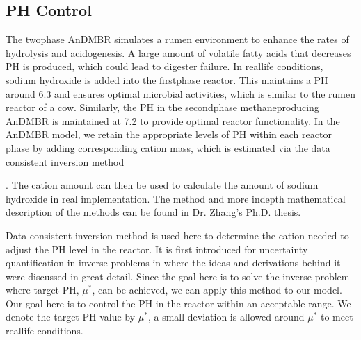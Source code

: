 \documentclass[a4paper,10pt,english]{sphinxmanual}
\begin{document}
{
\begin{sphinxVerbatim}[commandchars=\\\{\}]
\llap{\color{nbsphinxin}[ ]:\,\hspace{\fboxrule}\hspace{\fboxsep}}
\end{sphinxVerbatim}
}


\subsection{PH Control}
\label{\detokenize{jupyter_notebook/phcontrol:ph-control}}\label{\detokenize{jupyter_notebook/phcontrol::doc}}
\sphinxAtStartPar
The two\sphinxhyphen{}phase AnDMBR simulates a rumen environment to enhance the rates of hydrolysis and acidogenesis. A large amount of volatile fatty acids that decreases PH is produced, which could lead to digester failure. In real\sphinxhyphen{}life conditions, sodium hydroxide is added into the first\sphinxhyphen{}phase reactor. This maintains a PH around 6.3 and ensures optimal microbial activities, which is similar to the rumen reactor of a cow. Similarly, the PH in the second\sphinxhyphen{}phase methane\sphinxhyphen{}producing AnDMBR is maintained at 7.2 to provide optimal reactor functionality. In the AnDMBR model, we retain the appropriate levels of PH within each reactor phase by adding corresponding cation mass, which is estimated via the data consistent inversion method %
\begin{footnote}[1]\sphinxAtStartFootnote
{}
%
\end{footnote}. The cation amount can then be used to calculate the amount of sodium hydroxide in real implementation. The method and more in\sphinxhyphen{}depth mathematical description of the  methods can be found in Dr. Zhang’s Ph.D. thesis.

\sphinxAtStartPar
{}

\sphinxAtStartPar
Data consistent inversion method is used here to determine the cation needed to adjust the PH level in the reactor. It is first introduced for uncertainty quantification in inverse problems in \sphinxfootnotemark[1] where the ideas and derivations behind it were discussed in great detail. Since the goal here is to solve the inverse problem where target PH, \(\mu^*\), can be achieved, we can apply this method to our model. Our goal here is to control the PH in the reactor within an acceptable range. We denote the target PH value by \(\mu^*\), a small deviation is allowed around \(\mu^*\) to meet real\sphinxhyphen{}life conditions.
\end{document}

